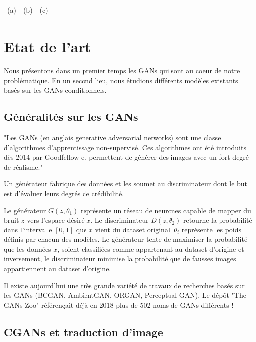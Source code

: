 \documentclass[a4paper, 12pt]{report}
\begin{document}
\begin{center}
\begin{tabular}{ccc}
    (a)&(b)&(c)
  \end{tabular}
\end{center}



\chapter{Etat de l'art}
 
Nous présentons dans un premier temps les GANs qui sont au coeur de notre problématique. En un second lieu, nous étudions différents modèles existants basés sur les GANs conditionnels. 

\section{Généralités sur les GANs}

"Les GANs (en anglais generative adversarial networks) sont une classe d'algorithmes d'apprentissage non-supervisé. Ces algorithmes ont été introduits dès 2014 par Goodfellow et permettent de générer des images avec un fort degré de réalisme." \cite{wiki:Reseaux-antagonistes-generatifs}

Un générateur fabrique des données et les soumet au discriminateur dont le but est d'évaluer leurs degrés de crédibilité. 

Le générateur $G(z, \theta_{1})$ représente un réseau de neurones capable de mapper du bruit $z$ vers l'espace désiré $x$. Le discriminateur $D(z, \theta_{2})$ retourne la probabilité dans l'intervalle $[0,1]$ que $x$ vient du dataset original. $\theta_{i}$ représente les poids définis par chacun des modèles. Le générateur tente de maximiser la probabilité que les données $x$, soient classifiées comme appartenant au dataset d'origine et inversement, le discriminateur minimise la probabilité que de fausses images appartiennent au dataset d'origine.

Il existe aujourd'hui une très grande variété de travaux de recherches basés sur les GANs (BCGAN, AmbientGAN, ORGAN, Perceptual GAN). Le dépôt "The GANs Zoo" \cite{hindupuravinash} référençait déjà en 2018 plus de 502 noms de GANs différents !


\section{CGANs et traduction d'image}
\end{document}
